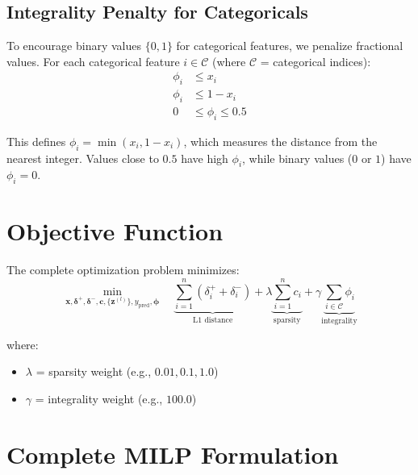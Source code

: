 \documentclass{article}
\begin{document}
\subsection{Integrality Penalty for Categoricals}

To encourage binary values $\{0, 1\}$ for categorical features, we penalize fractional values. For each categorical feature $i \in \mathcal{C}$ (where $\mathcal{C}$ = categorical indices):
\begin{align}
\phi_i &\leq x_i \\
\phi_i &\leq 1 - x_i \\
0 &\leq \phi_i \leq 0.5
\end{align}

This defines $\phi_i = \min(x_i, 1-x_i)$, which measures the distance from the nearest integer. Values close to $0.5$ have high $\phi_i$, while binary values ($0$ or $1$) have $\phi_i = 0$.

\section{Objective Function}

The complete optimization problem minimizes:
\begin{equation}
\boxed{
\min_{\mathbf{x}, \boldsymbol{\delta}^+, \boldsymbol{\delta}^-, \mathbf{c}, \{\mathbf{z}^{(l)}\}, y_{\text{pred}}, \boldsymbol{\phi}} \quad
\underbrace{\sum_{i=1}^{n} (\delta_i^+ + \delta_i^-)}_{\text{L1 distance}} +
\lambda \underbrace{\sum_{i=1}^{n} c_i}_{\text{sparsity}} +
\gamma \underbrace{\sum_{i \in \mathcal{C}} \phi_i}_{\text{integrality}}
}
\end{equation}

where:
\begin{itemize}
    \item $\lambda$ = sparsity weight (e.g., $0.01, 0.1, 1.0$)
    \item $\gamma$ = integrality weight (e.g., $100.0$)
\end{itemize}

\section{Complete MILP Formulation}
\end{document}

